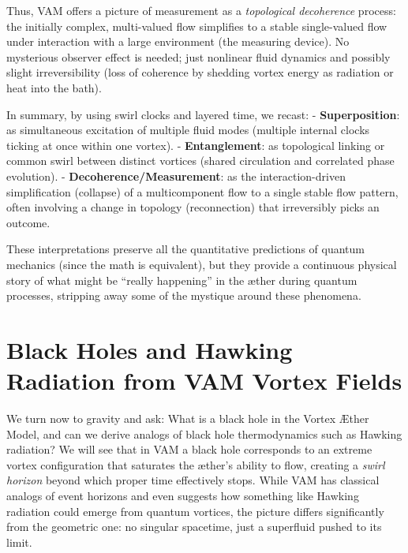 \documentclass[a4paper,12pt]{article}
\begin{document}
    Thus, VAM offers a picture of measurement as a \emph{topological decoherence} process: the initially complex, multi-valued flow simplifies to a stable single-valued flow under interaction with a large environment (the measuring device). No mysterious observer effect is needed; just nonlinear fluid dynamics and possibly slight irreversibility (loss of coherence by shedding vortex energy as radiation or heat into the bath).

    In summary, by using swirl clocks and layered time, we recast:
    - \textbf{Superposition}: as simultaneous excitation of multiple fluid modes (multiple internal clocks ticking at once within one vortex).
    - \textbf{Entanglement}: as topological linking or common swirl between distinct vortices (shared circulation and correlated phase evolution).
    - \textbf{Decoherence/Measurement}: as the interaction-driven simplification (collapse) of a multicomponent flow to a single stable flow pattern, often involving a change in topology (reconnection) that irreversibly picks an outcome.

    These interpretations preserve all the quantitative predictions of quantum mechanics (since the math is equivalent), but they provide a continuous physical story of what might be “really happening” in the æther during quantum processes, stripping away some of the mystique around these phenomena.

\section{Black Holes and Hawking Radiation from VAM Vortex Fields}
    We turn now to gravity and ask: What is a black hole in the Vortex Æther Model, and can we derive analogs of black hole thermodynamics such as Hawking radiation? We will see that in VAM a black hole corresponds to an extreme vortex configuration that saturates the æther’s ability to flow, creating a \emph{swirl horizon} beyond which proper time effectively stops. While VAM has classical analogs of event horizons and even suggests how something like Hawking radiation could emerge from quantum vortices, the picture differs significantly from the geometric one: no singular spacetime, just a superfluid pushed to its limit.
\end{document}
